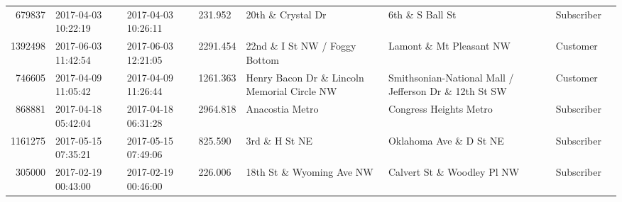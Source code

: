 \documentclass[11pt]{article}
\begin{document}
\begin{description}
\begin{tabular}{r|lllllll}
	  679837                                                 & 2017-04-03 10:22:19                                     & 2017-04-03 10:26:11                                     &  231.952                                                & 20th \& Crystal Dr                                     & 6th \& S Ball St                                       & Subscriber                                             \\
	 1392498                                                 & 2017-06-03 11:42:54                                     & 2017-06-03 12:21:05                                     & 2291.454                                                & 22nd \& I St NW / Foggy Bottom                         & Lamont \& Mt Pleasant NW                               & Customer                                               \\
	  746605                                                 & 2017-04-09 11:05:42                                     & 2017-04-09 11:26:44                                     & 1261.363                                                & Henry Bacon Dr \& Lincoln Memorial Circle NW           & Smithsonian-National Mall / Jefferson Dr \& 12th St SW & Customer                                               \\
	  868881                                               & 2017-04-18 05:42:04                                   & 2017-04-18 06:31:28                                   & 2964.818                                              & Anacostia Metro                                       & Congress Heights Metro                                & Subscriber                                           \\
	 1161275                                                 & 2017-05-15 07:35:21                                     & 2017-05-15 07:49:06                                     &  825.590                                                & 3rd \& H St NE                                         & Oklahoma Ave \& D St NE                                & Subscriber                                             \\
	  305000                                                 & 2017-02-19 00:43:00                                     & 2017-02-19 00:46:00                                     &  226.006                                                & 18th St \& Wyoming Ave NW                              & Calvert St \& Woodley Pl NW                            & Subscriber                                             \\

\end{tabular}
\end{description}
\end{document}
